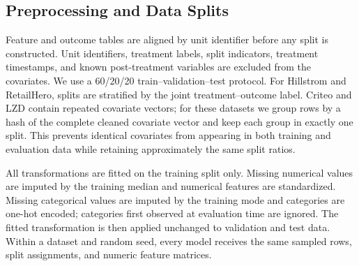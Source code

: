 \documentclass[twocolumn]{style}
\begin{document}
\begin{table}[!htpb]
    \caption{Datasets used in the baseline comparison. The feature count is measured after the
    train-fitted transformation.}
    \label{tab:datasets}
    \centering
    \small
\end{table}

\subsection{Preprocessing and Data Splits}
Feature and outcome tables are aligned by unit identifier before any split is constructed. Unit
identifiers, treatment labels, split indicators, treatment timestamps, and known post-treatment
variables are excluded from the covariates. We use a 60/20/20 train--validation--test protocol. For
Hillstrom and RetailHero, splits are stratified by the joint treatment--outcome label. Criteo and
LZD contain repeated covariate vectors; for these datasets we group rows by a hash of the complete
cleaned covariate vector and keep each group in exactly one split. This prevents identical covariates from
appearing in both training and evaluation data while retaining approximately the same split ratios.

All transformations are fitted on the training split only. Missing numerical values are imputed by
the training median and numerical features are standardized. Missing categorical values are imputed
by the training mode and categories are one-hot encoded; categories first observed at evaluation
time are ignored. The fitted transformation is then applied unchanged to validation and test data.
Within a dataset and random seed, every model receives the same sampled rows, split assignments, and
numeric feature matrices.
\end{document}
